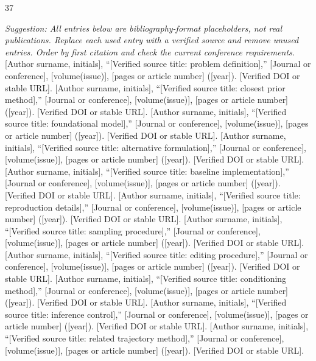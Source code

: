 \begin{thebibliography}{37}
\item[] \textit{Suggestion: All entries below are bibliography-format placeholders, not real publications. Replace each used entry with a verified source and remove unused entries. Order by first citation and check the current conference requirements.}
 [Author surname, initials], ``[Verified source title: problem definition],'' [Journal or conference], [volume(issue)], [pages or article number] ([year]). [Verified DOI or stable URL].
 [Author surname, initials], ``[Verified source title: closest prior method],'' [Journal or conference], [volume(issue)], [pages or article number] ([year]). [Verified DOI or stable URL].
 [Author surname, initials], ``[Verified source title: foundational model],'' [Journal or conference], [volume(issue)], [pages or article number] ([year]). [Verified DOI or stable URL].
 [Author surname, initials], ``[Verified source title: alternative formulation],'' [Journal or conference], [volume(issue)], [pages or article number] ([year]). [Verified DOI or stable URL].
 [Author surname, initials], ``[Verified source title: baseline implementation],'' [Journal or conference], [volume(issue)], [pages or article number] ([year]). [Verified DOI or stable URL].
 [Author surname, initials], ``[Verified source title: reproduction details],'' [Journal or conference], [volume(issue)], [pages or article number] ([year]). [Verified DOI or stable URL].
 [Author surname, initials], ``[Verified source title: sampling procedure],'' [Journal or conference], [volume(issue)], [pages or article number] ([year]). [Verified DOI or stable URL].
 [Author surname, initials], ``[Verified source title: editing procedure],'' [Journal or conference], [volume(issue)], [pages or article number] ([year]). [Verified DOI or stable URL].
 [Author surname, initials], ``[Verified source title: conditioning method],'' [Journal or conference], [volume(issue)], [pages or article number] ([year]). [Verified DOI or stable URL].
 [Author surname, initials], ``[Verified source title: inference control],'' [Journal or conference], [volume(issue)], [pages or article number] ([year]). [Verified DOI or stable URL].
 [Author surname, initials], ``[Verified source title: related trajectory method],'' [Journal or conference], [volume(issue)], [pages or article number] ([year]). [Verified DOI or stable URL].

\end{thebibliography}

